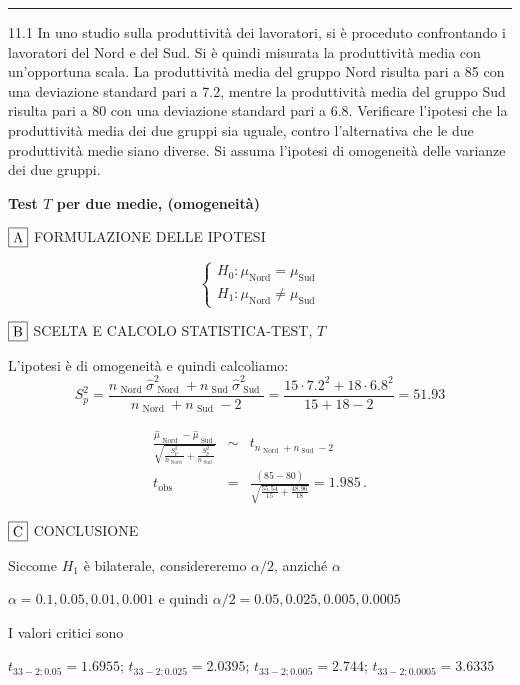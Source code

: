 \documentclass[
  11pt,
]{book}
\theoremstyle{mytheoremstyle}
\theoremstyle{mydefstyle}
\newenvironment{sol}
  {
  \begin{tcolorbox}[enhanced,breakable,arc=0.1mm,boxrule=1pt,colback=white,colframe=iblue,
  title=\bf \fontfamily{lmss}\selectfont \hspace{.5 cm} Soluzione,drop fuzzy shadow]

}{
\end{tcolorbox}
  }
\begin{document}
\begin{center}\rule{0.5\linewidth}{0.5pt}\end{center}

11.1 In uno studio sulla produttività dei lavoratori, si è proceduto confrontando i lavoratori del Nord e del Sud. Si è quindi misurata la produttività media con un'opportuna scala. La produttività media del gruppo Nord risulta pari a 85 con una deviazione standard pari a 7.2, mentre la produttività media del gruppo Sud risulta pari a 80 con una deviazione standard pari a 6.8. Verificare l'ipotesi che la produttività media dei due gruppi sia uguale, contro l'alternativa che le due produttività medie siano diverse. Si assuma l'ipotesi di omogeneità delle varianze dei due gruppi.

\begin{sol}
\textbf{Test \(T\) per due medie, (omogeneità)}

\(\fbox{A}\) FORMULAZIONE DELLE IPOTESI

\[\begin{cases}
   H_0: \mu_\text{Nord} = \mu_\text{Sud} \\
   H_1: \mu_\text{Nord} \neq \mu_\text{Sud} 
   \end{cases}\]

\(\fbox{B}\) SCELTA E CALCOLO STATISTICA-TEST, \(T\)

L'ipotesi è di omogeneità e quindi calcoliamo:\[
   S_p^2=\frac{n_\text{ Nord }\hat\sigma^2_\text{ Nord }+n_\text{ Sud }\hat\sigma^2_\text{ Sud }}{n_\text{ Nord }+n_\text{ Sud }-2} =
   \frac{ 15 \cdot 7.2 ^2+ 18 \cdot 6.8 ^2}{ 15 + 18 -2}= 51.93 
  \]

\begin{eqnarray*}
  \frac{\hat\mu_\text{ Nord } - \hat\mu_\text{ Sud }}
  {\sqrt{\frac {S^2_p}{n_\text{ Nord }}+\frac {S^2_p}{n_\text{ Sud }}}}&\sim&t_{n_\text{ Nord }+n_\text{ Sud }-2}\\
  t_{\text{obs}}
  &=& \frac{ ( 85 -  80 )} {\sqrt{\frac{ 55.54 }{ 15 }+\frac{ 48.96 }{ 18 }}}
  =   1.985 \, .
  \end{eqnarray*}

\(\fbox{C}\) CONCLUSIONE

Siccome \(H_1\) è bilaterale, considereremo \(\alpha/2\),
anziché \(\alpha\)

\(\alpha=0.1, 0.05, 0.01, 0.001\) e quindi \(\alpha/2=0.05, 0.025, 0.005, 0.0005\)

I valori critici sono

\(t_{33-2;0.05}=1.6955\); \(t_{33-2;0.025}=2.0395\); \(t_{33-2;0.005}=2.744\); \(t_{33-2;0.0005}=3.6335\)


\end{sol}
\end{document}
